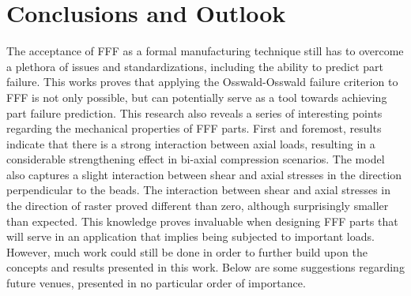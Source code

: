 \documentclass[main.tex]{subfiles}
\begin{document}
\chapter{Conclusions and Outlook} \label{ch:concl}
The acceptance of FFF as a formal manufacturing technique still has to overcome a plethora of issues and standardizations, including the ability to predict part failure. This works proves that applying the Osswald-Osswald failure criterion to FFF is not only possible, but can potentially serve as a tool towards achieving part failure prediction. This research also reveals a series of interesting points regarding the mechanical properties of FFF parts. First and foremost, results indicate that there is a strong interaction between axial loads, resulting in a considerable strengthening effect in bi-axial compression scenarios. The model also captures a slight interaction between shear and axial stresses in the direction perpendicular to the beads. The interaction between shear and axial stresses in the direction of raster proved different than zero, although surprisingly smaller than expected. This knowledge proves invaluable when designing FFF parts that will serve in an application that implies being subjected to important loads. However, much work could still be done in order to further build upon the concepts and results presented in this work. Below are some suggestions regarding future venues, presented in no particular order of importance.
\end{document}
